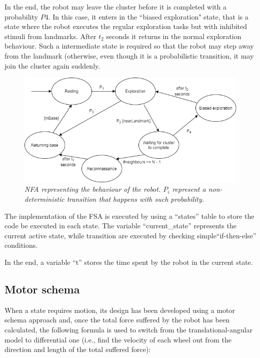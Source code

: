 \noindent
In the end, the robot may leave the cluster before it is completed with a probability $P4$. In this case, it enters in the ``biased exploration" state, that is a state where the robot executes the regular exploration tasks
but with inhibited stimuli from landmarks. After $t_2$ seconds it returns in the normal exploration behaviour. Such a intermediate state is required so that the robot may step away from the landmark (otherwise, even though it is a probabilistic transition, it may join the cluster again suddenly.  

\begin{figure}[H]
\centering
\includegraphics[width=\linewidth]{images/NFA.png}
\caption{\textit{NFA representing the behaviour of the robot. $P_i$ represent a non-deterministic transition that happens with such probability.}}
\label{fig:NFA}
\end{figure}

The implementation of the FSA is executed by using a ``states'' table to store the code be executed in each state. The variable ``current\_state'' represents the current active state, while transition are executed by checking simple``if-then-else'' conditions.

\noindent
In the end, a variable ``t'' stores the time spent by the robot in the current state.

\subsection{Motor schema}

When a state requires motion, its design has been developed using a motor schema approach and, once the total force suffered by the robot has been calculated, the following formula is used to switch from the translational-angular model to differential one (i.e., find the velocity of each wheel out from the direction and length of the total suffered force):    

